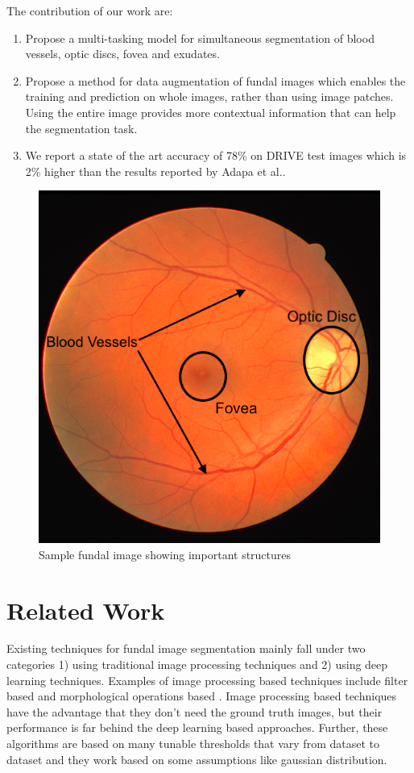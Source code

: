\documentclass{article}
\begin{document}
The contribution of our work are:
\begin{enumerate}
  \item Propose a multi-tasking model for simultaneous segmentation of blood vessels, optic discs, fovea and exudates.
  \item Propose a method for data augmentation of fundal images which enables the training and prediction on whole images, rather than using image patches.
  Using the entire image provides more contextual information that can help the segmentation task.
  \item We report a state of the art accuracy of 78\% on DRIVE test images which is 2\% higher than the results reported by Adapa et al.\cite{adapa2020supervised}.
\end{enumerate}

\begin{figure}[!ht]
  \centering
  \includegraphics[width=0.5\linewidth]{images/eye_1.png}
  \caption{Sample fundal image showing important structures}
  \label{sample_funal_image}
\end{figure}

\section{Related Work}
Existing  techniques for fundal image segmentation mainly fall under two categories 1) using traditional image processing techniques and 2) using deep learning techniques.
Examples of image processing based techniques include filter based \cite{zhang2010retinal} \cite{yavuz2011retinal} \cite{aslan2018segmentation} and morphological operations based \cite{hassan2015retinal}\cite{singh2014new}.
Image processing based techniques have the advantage that they don’t need the ground truth images, but their performance is far behind the deep learning based approaches.
Further, these algorithms are based on many tunable thresholds that vary from dataset to dataset and they work based on some assumptions like gaussian distribution.
\end{document}
